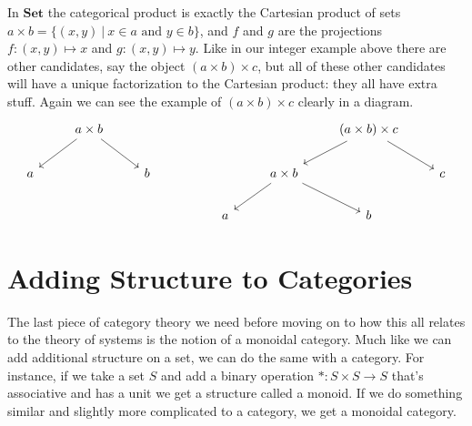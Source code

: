 \documentclass[12pt]{article}
\newcounter{examp}
\begin{document}
In $\textbf{Set}$ the categorical product is exactly the Cartesian product of sets $a \times b = \{(x, y) \ | \ x\in a \text{ and } y\in b\}$, and $f$ and $g$ are the projections $f: (x, y) \mapsto x$ and $g: (x, y) \mapsto y$.
Like in our integer example above there are other candidates, say the object $(a \times b) \times c$, but all of these other candidates will have a unique factorization to the Cartesian product: they all have extra stuff.
Again we can see the example of $(a \times b) \times c$ clearly in a diagram.
\[\begin{tikzcd}
        & {a\times b} &&&&& {(a\times b) \times c} \\
        a && b &&& {a \times b} && c \\
        &&&& a && b
        \arrow[from=1-2, to=2-1]
        \arrow[from=1-2, to=2-3]
        \arrow[from=1-7, to=2-8]
        \arrow[from=1-7, to=2-6]
        \arrow[from=2-6, to=3-5]
        \arrow[from=2-6, to=3-7]
    \end{tikzcd}\]





\section*{Adding Structure to Categories}
The last piece of category theory we need before moving on to how this all relates to the theory of systems is the notion of a monoidal category.
Much like we can add additional structure on a set, we can do the same with a category.
For instance, if we take a set $S$ and add a binary operation $*:S \times S \rightarrow S$ that's associative and has a unit we get a structure called a monoid.
If we do something similar and slightly more complicated to a category, we get a monoidal category.
\end{document}
